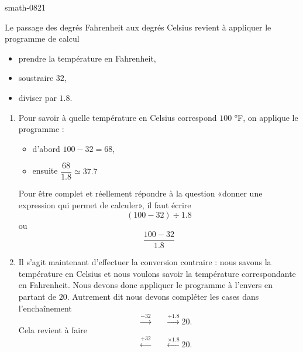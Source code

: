
\begin{corrige}{smath-0821}

    Le passage des degrés Fahrenheit aux degrés Celsius revient à appliquer le programme de calcul
    \begin{itemize}
        \item prendre la température en Fahrenheit,
        \item soustraire \( 32\),
        \item diviser par \( 1.8\).
    \end{itemize}
    \begin{enumerate}
        \item
            Pour savoir à quelle température en Celsius correspond \( 100 \) °F, on applique le programme :
            \begin{itemize}
                \item d'abord \( 100-32=68\),
                \item ensuite \( \dfrac{ 68 }{ 1.8 }\simeq 37.7\)
            \end{itemize}
            Pour être complet et réellement répondre à la question «donner une expression qui permet de calculer», il faut écrire
            \begin{equation}
                (100-32)\div 1.8
            \end{equation}
            ou
            \begin{equation}
                \frac{ 100-32 }{ 1.8 }
            \end{equation}
        \item 
            Il s'agit maintenant d'effectuer la conversion contraire : nous savons la température en Celsius et nous voulons savoir la température correspondante en Fahrenheit. Nous devons donc appliquer le programme à l'envers en partant de \( 20\). Autrement dit nous devons compléter les cases dans l'enchaînement
            \begin{equation}
                \boxed{\phantom{301}}\stackrel{-32}{\longrightarrow}\boxed{\phantom{301}}\stackrel{\div 1.8}{\longrightarrow}\boxed{20}.
            \end{equation}
            Cela revient à faire
            \begin{equation}
                \boxed{\phantom{301}}\stackrel{+32}{\longleftarrow}\boxed{\phantom{301}}\stackrel{\times 1.8}{\longleftarrow}\boxed{20}.

\end{equation}
\end{enumerate}
\end{corrige}
